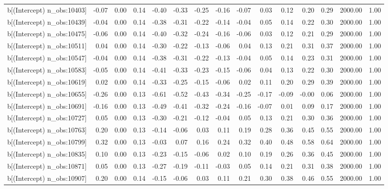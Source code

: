 \begin{table}[ht]
\begin{tabular}{rrrrrrrrrrrrrrr}
  b[(Intercept) n\_obs:10403] & -0.07 & 0.00 & 0.14 & -0.40 & -0.33 & -0.25 & -0.16 & -0.07 & 0.03 & 0.12 & 0.20 & 0.29 & 2000.00 & 1.00 \\ 
  b[(Intercept) n\_obs:10439] & -0.04 & 0.00 & 0.14 & -0.38 & -0.31 & -0.22 & -0.14 & -0.04 & 0.05 & 0.14 & 0.22 & 0.30 & 2000.00 & 1.00 \\ 
  b[(Intercept) n\_obs:10475] & -0.06 & 0.00 & 0.14 & -0.40 & -0.32 & -0.24 & -0.16 & -0.06 & 0.03 & 0.12 & 0.21 & 0.29 & 2000.00 & 1.00 \\ 
  b[(Intercept) n\_obs:10511] & 0.04 & 0.00 & 0.14 & -0.30 & -0.22 & -0.13 & -0.06 & 0.04 & 0.13 & 0.21 & 0.31 & 0.37 & 2000.00 & 1.00 \\ 
  b[(Intercept) n\_obs:10547] & -0.04 & 0.00 & 0.14 & -0.38 & -0.31 & -0.22 & -0.13 & -0.04 & 0.05 & 0.14 & 0.23 & 0.31 & 2000.00 & 1.00 \\ 
  b[(Intercept) n\_obs:10583] & -0.05 & 0.00 & 0.14 & -0.41 & -0.33 & -0.23 & -0.15 & -0.06 & 0.04 & 0.13 & 0.22 & 0.30 & 2000.00 & 1.00 \\ 
  b[(Intercept) n\_obs:10619] & 0.02 & 0.00 & 0.14 & -0.33 & -0.25 & -0.15 & -0.06 & 0.02 & 0.11 & 0.20 & 0.29 & 0.39 & 2000.00 & 1.00 \\ 
  b[(Intercept) n\_obs:10655] & -0.26 & 0.00 & 0.13 & -0.61 & -0.52 & -0.43 & -0.34 & -0.25 & -0.17 & -0.09 & -0.00 & 0.06 & 2000.00 & 1.00 \\ 
  b[(Intercept) n\_obs:10691] & -0.16 & 0.00 & 0.13 & -0.49 & -0.41 & -0.32 & -0.24 & -0.16 & -0.07 & 0.01 & 0.09 & 0.17 & 2000.00 & 1.00 \\ 
  b[(Intercept) n\_obs:10727] & 0.05 & 0.00 & 0.13 & -0.30 & -0.21 & -0.12 & -0.04 & 0.05 & 0.13 & 0.21 & 0.30 & 0.36 & 2000.00 & 1.00 \\ 
  b[(Intercept) n\_obs:10763] & 0.20 & 0.00 & 0.13 & -0.14 & -0.06 & 0.03 & 0.11 & 0.19 & 0.28 & 0.36 & 0.45 & 0.55 & 2000.00 & 1.00 \\ 
  b[(Intercept) n\_obs:10799] & 0.32 & 0.00 & 0.13 & -0.03 & 0.07 & 0.16 & 0.24 & 0.32 & 0.40 & 0.48 & 0.58 & 0.64 & 2000.00 & 1.00 \\ 
  b[(Intercept) n\_obs:10835] & 0.10 & 0.00 & 0.13 & -0.23 & -0.15 & -0.06 & 0.02 & 0.10 & 0.19 & 0.26 & 0.36 & 0.45 & 2000.00 & 1.00 \\ 
  b[(Intercept) n\_obs:10871] & 0.05 & 0.00 & 0.13 & -0.27 & -0.19 & -0.11 & -0.03 & 0.05 & 0.14 & 0.21 & 0.31 & 0.38 & 2000.00 & 1.00 \\ 
  b[(Intercept) n\_obs:10907] & 0.20 & 0.00 & 0.14 & -0.15 & -0.06 & 0.03 & 0.11 & 0.21 & 0.30 & 0.38 & 0.46 & 0.55 & 2000.00 & 1.00 \\ 

\end{tabular}
\end{table}
